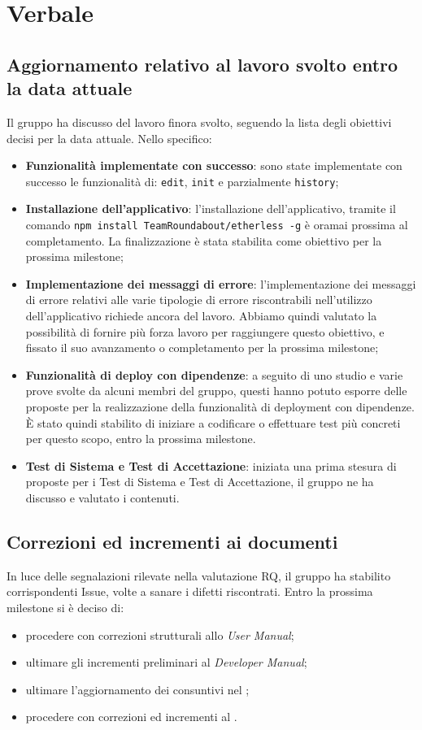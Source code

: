 \section{Verbale}

	\subsection{Aggiornamento relativo al lavoro svolto entro la data attuale}
	Il gruppo ha discusso del lavoro finora svolto, seguendo la lista degli obiettivi decisi per la data attuale. Nello specifico:
	\begin{itemize}
		\item \textbf{Funzionalità implementate con successo}: sono state implementate con successo le funzionalità di: \texttt{edit}, \texttt{init} e parzialmente \texttt{history}; 
		\item \textbf{Installazione dell'applicativo}: l'installazione dell'applicativo, tramite il comando \texttt{npm install TeamRoundabout/etherless -g} è oramai prossima al completamento. La finalizzazione è stata stabilita come obiettivo per la prossima milestone\textit{};
		\item \textbf{Implementazione dei messaggi di errore}: l'implementazione dei messaggi di errore relativi alle varie tipologie di errore riscontrabili nell'utilizzo dell'applicativo richiede ancora del lavoro. Abbiamo quindi valutato la possibilità di fornire più forza lavoro per raggiungere questo obiettivo, e fissato il suo avanzamento o completamento per la prossima milestone\textit{};
		\item \textbf{Funzionalità di deploy\textit{} con dipendenze}: a seguito di uno studio e varie prove svolte da alcuni membri del gruppo, questi hanno potuto esporre delle proposte per la realizzazione della funzionalità di deployment\textit{} con dipendenze. È stato quindi stabilito di iniziare a codificare o effettuare test più concreti per questo scopo, entro la prossima milestone\textit{}.
		\item \textbf{Test di Sistema e Test di Accettazione}: iniziata una prima stesura di proposte per i Test di Sistema e Test di Accettazione, il gruppo ne ha discusso e valutato i contenuti.
	\end{itemize}
	\subsection{Correzioni ed incrementi ai documenti}
		In luce delle segnalazioni rilevate nella valutazione RQ, il gruppo ha stabilito corrispondenti Issue, volte a sanare i difetti riscontrati. Entro la prossima milestone\textit{} si è deciso di:
		\begin{itemize}
			\item procedere con correzioni strutturali allo \textit{User Manual};
			\item ultimare gli incrementi preliminari al \textit{Developer Manual};
			\item ultimare l'aggiornamento dei consuntivi nel \PdP{};
			\item procedere con correzioni ed incrementi al \PdQ{}.
		\end{itemize}

